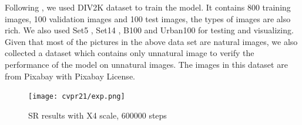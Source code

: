 \documentclass[final]{cvpr}
\begin{document}
Following \cite{r1}, we used DIV2K \cite{r7} dataset to train the model. It contains 800 training images, 100 validation images and 100 test images, the types of images are also rich. We also used Set5 \cite{r8}, Set14 \cite{r9}, B100 \cite{r10} and Urban100 \cite{r11} for testing and visualizing. Given that most of the pictures in the above data set are natural images, we also collected a dataset which contains only unnatural image to verify the performance of the model on unnatural images. The images in this dataset are from Pixabay with Pixabay License. 
\begin{figure}
\begin{center}
    \texttt{[image: cvpr21/exp.png]}
\end{center}
   \caption{SR results with X4 scale, 600000 steps}
\label{exp}
\end{figure}
\end{document}
